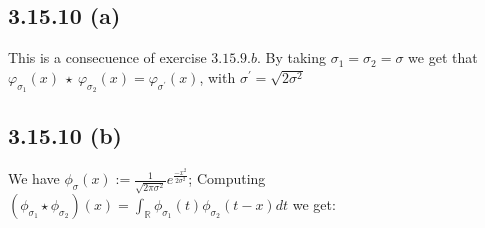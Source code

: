 \documentclass{exam}
\begin{document}
\subsection*{3.15.10 (a)}
This is a consecuence of exercise $3.15.9.b$. By taking $\sigma_1 = \sigma_2 = \sigma$ we get that $\varphi_{\sigma_1}(x) \ \star \ \varphi_{\sigma_2}(x) = \varphi_{\sigma^\prime}(x)$, with $\sigma^\prime = \displaystyle\sqrt{2\sigma^2}$
\subsection*{3.15.10 (b)}
We have $\phi_{\sigma}(x) := \displaystyle\frac{1}{\sqrt{2\pi\sigma^{2}}}e^{\frac{-x^2}{2\sigma^2}}$; Computing $(\phi_{\sigma_1}\star \phi_{\sigma_2})(x) = \displaystyle \int_{\mathbb{R}}  \phi_{\sigma_1}(t) \phi_{\sigma_2}(t - x) d t $ we get:\\
\end{document}
